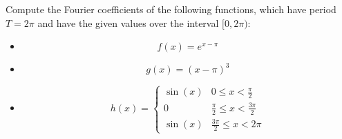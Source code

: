 \documentclass[11pt]{article}
\begin{document}
\begin{exercise}
    Compute the Fourier coefficients of the following functions, which have period $T = 2\pi$ and have the given values over the interval $[0,2\pi)$:
    \begin{itemize}
     \item 
     \[
        f(x) = e^{x - \pi}
     \]
     \item 
     \[
        g(x) = {(x - \pi)^3}
     \]
     \item 
     \[
        h(x) = \left\{\begin{array}{ll}
            \sin(x) & 0 \leq x < \frac \pi 2
            \\
            0   & \frac \pi 2 \leq x < \frac{3\pi}{2} 
            \\
            \sin(x) & \frac {3\pi} 2 \leq x < 2\pi
        \end{array}\right.
     \]
    \end{itemize}
\end{exercise}
\end{document}
